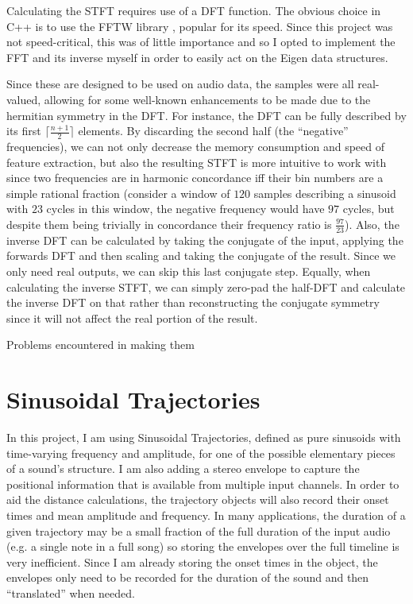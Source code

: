 \documentclass[10pt,twoside,a4paper]{report}
\begin{document}
Calculating the STFT requires use of a DFT function. The obvious choice in C++ is to use the FFTW library \cite{fftw}, popular for its speed. Since this project was not speed-critical, this was of little importance and so I opted to implement the FFT and its inverse myself in order to easily act on the Eigen data structures.

Since these are designed to be used on audio data, the samples were all real-valued, allowing for some well-known enhancements to be made due to the hermitian symmetry in the DFT. For instance, the DFT can be fully described by its first $ \lceil \frac{n+1}{2} \rceil $ elements. By discarding the second half (the ``negative'' frequencies), we can not only decrease the memory consumption and speed of feature extraction, but also the resulting STFT is more intuitive to work with since two frequencies are in harmonic concordance iff their bin numbers are a simple rational fraction (consider a window of $ 120 $ samples describing a sinusoid with $ 23 $ cycles in this window, the negative frequency would have $ 97 $ cycles, but despite them being trivially in concordance their frequency ratio is $ \frac{97}{23} $). Also, the inverse DFT can be calculated by taking the conjugate of the input, applying the forwards DFT and then scaling and taking the conjugate of the result. Since we only need real outputs, we can skip this last conjugate step. Equally, when calculating the inverse STFT, we can simply zero-pad the half-DFT and calculate the inverse DFT on that rather than reconstructing the conjugate symmetry since it will not affect the real portion of the result.

Problems encountered in making them

\section{Sinusoidal Trajectories}

In this project, I am using Sinusoidal Trajectories, defined as pure sinusoids with time-varying frequency and amplitude, for one of the possible elementary pieces of a sound's structure. I am also adding a stereo envelope to capture the positional information that is available from multiple input channels. In order to aid the distance calculations, the trajectory objects will also record their onset times and mean amplitude and frequency. In many applications, the duration of a given trajectory may be a small fraction of the full duration of the input audio (e.g. a single note in a full song) so storing the envelopes over the full timeline is very inefficient. Since I am already storing the onset times in the object, the envelopes only need to be recorded for the duration of the sound and then ``translated'' when needed.
\end{document}
